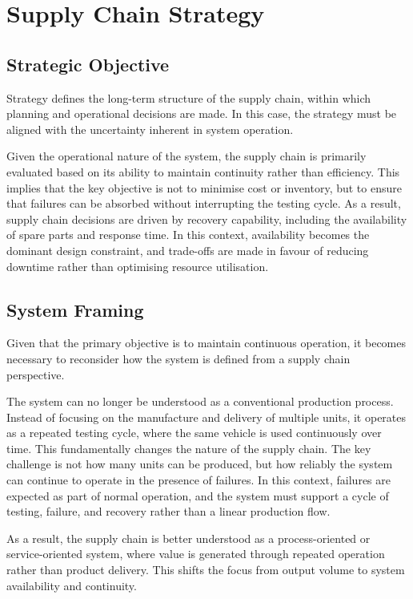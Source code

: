 \documentclass[11pt, a4paper]{report}
\numberwithin{equation}{section}
\begin{document}
\section{Supply Chain Strategy}

\subsection{Strategic Objective}

Strategy defines the long-term structure of the supply chain, within which planning and operational decisions are made. In this case, the strategy must be aligned with the uncertainty inherent in system operation.

Given the operational nature of the system, the supply chain is primarily evaluated based on its ability to maintain continuity rather than efficiency. This implies that the key objective is not to minimise cost or inventory, but to ensure that failures can be absorbed without interrupting the testing cycle. As a result, supply chain decisions are driven by recovery capability, including the availability of spare parts and response time. In this context, availability becomes the dominant design constraint, and trade-offs are made in favour of reducing downtime rather than optimising resource utilisation.

\subsection{System Framing}

Given that the primary objective is to maintain continuous operation, it becomes necessary to reconsider how the system is defined from a supply chain perspective.

The system can no longer be understood as a conventional production process. Instead of focusing on the manufacture and delivery of multiple units, it operates as a repeated testing cycle, where the same vehicle is used continuously over time. This fundamentally changes the nature of the supply chain. The key challenge is not how many units can be produced, but how reliably the system can continue to operate in the presence of failures. In this context, failures are expected as part of normal operation, and the system must support a cycle of testing, failure, and recovery rather than a linear production flow.

As a result, the supply chain is better understood as a process-oriented or service-oriented system, where value is generated through repeated operation rather than product delivery. This shifts the focus from output volume to system availability and continuity.
\end{document}
